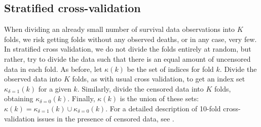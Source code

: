 \subsection{Stratified cross-validation}
When dividing an already small number of survival data observations into $K$ folds, we risk getting folds without any observed deaths, or in any case, very few. In stratified cross validation, we do not divide the folds entirely at random, but rather, try to divide the data such that there is an equal amount of uncensored data in each fold.
As before, let $\kappa(k)$ be the set of indices for fold $k$.
Divide the observed data into $K$ folds, as with usual cross validation, to get an index set $\kappa_{\delta=1}(k)$ for a given $k$. 
Similarly, divide the censored data into $K$ folds, obtaining $\kappa_{\delta=0}(k)$.
Finally, $\kappa(k)$ is the union of these sets: $\kappa(k)=\kappa_{\delta=1}(k)\cup\kappa_{\delta=0}(k)$.
For a detailed description of 10-fold cross-validation issues in the presence of censored data, see \citet{kohavi}.

